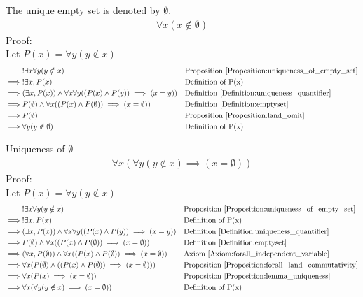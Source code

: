 \begin{defn}
\label{Definition:emptyset}
The unique empty set is denoted by $\emptyset$. \\
\begin{align*}
\forall x (x \notin \emptyset)
\end{align*}
Proof: \\
Let $P(x) = \forall y (y \notin x)$
\begin{align*}
& !\exists x \forall y (y \notin x) && \text{Proposition \ref{Proposition:uniqueness_of_empty_set}} \\
\implies & !\exists x, P(x)
&& \text{Definition of P(x)} \\
\implies & (\exists x, P(x)) \land \forall x \forall y ( (P(x) \land P(y)) \implies (x=y) )
&& \text{Definition \ref{Definition:uniqueness_quantifier}} \\
\implies & P(\emptyset) \land \forall x ( (P(x) \land P(\emptyset)) \implies (x=\emptyset) )
&& \text{Definition \ref{Definition:emptyset}} \\
\implies & P(\emptyset)
&& \text{Proposition \ref{Proposition:land_omit}} \\
\implies & \forall y (y \notin \emptyset)
&& \text{Definition of P(x)} \\
\end{align*}
\end{defn}

\begin{prop}
\label{Proposition:uniqueness_of_emptyset}
Uniqueness of $\emptyset$
\begin{align*}
\forall x (\forall y (y \notin x) \implies (x=\emptyset))
\end{align*}
Proof: \\
Let $P(x) = \forall y (y \notin x)$
\begin{align*}
& !\exists x \forall y (y \notin x) && \text{Proposition \ref{Proposition:uniqueness_of_empty_set}} \\
\implies & !\exists x, P(x)
&& \text{Definition of P(x)} \\
\implies & (\exists x, P(x)) \land \forall x \forall y ( (P(x) \land P(y)) \implies (x=y) )
&& \text{Definition \ref{Definition:uniqueness_quantifier}} \\
\implies & P(\emptyset) \land \forall x ( (P(x) \land P(\emptyset)) \implies (x=\emptyset) )
&& \text{Definition \ref{Definition:emptyset}} \\
\implies & (\forall x, P(\emptyset)) \land \forall x ( (P(x) \land P(\emptyset)) \implies (x=\emptyset) )
&& \text{Axiom \ref{Axiom:forall_independent_variable}} \\
\implies & \forall x ( P(\emptyset) \land ((P(x) \land P(\emptyset)) \implies (x=\emptyset)) )
&& \text{Proposition \ref{Proposition:forall_land_commutativity}} \\
\implies & \forall x (P(x) \implies (x=\emptyset))
&& \text{Proposition \ref{Proposition:lemma_uniqueness}} \\
\implies & \forall x (\forall y (y \notin x) \implies (x=\emptyset))
&& \text{Definition of P(x)} \\
\end{align*}
\end{prop}

